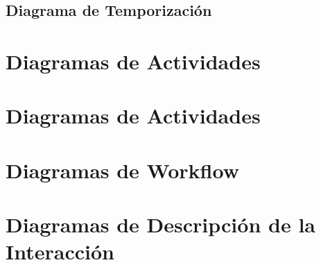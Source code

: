 \subsection{Diagrama de Temporización}

\newpage

\section{Diagramas de Actividades}

\newpage

\section{Diagramas de Actividades}

\newpage

\section{Diagramas de Workflow}

\newpage

\section{Diagramas de Descripción de la Interacción}

\newpage
